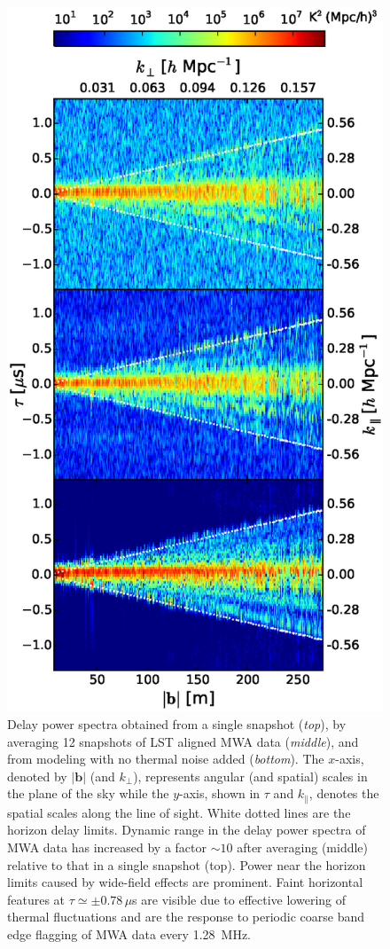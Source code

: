 \documentclass[preprint2,apjl,numberedappendix,twocolappendix,appendixfloats]{emulateapj}
\begin{document}
\begin{figure}[htb]
\centering
\includegraphics[width=\linewidth]{f1.eps}
\caption{Delay power spectra obtained from a single snapshot ({\it top}), by averaging 12 snapshots of LST aligned MWA data ({\it middle}), and from modeling with no thermal noise added ({\it bottom}). The $x$-axis, denoted by $|\boldsymbol{b}|$ (and $k_\perp$), represents angular (and spatial) scales in the plane of the sky while the $y$-axis, shown in $\tau$ and $k_\parallel$, denotes the spatial scales along the line of sight. White dotted lines are the horizon delay limits. Dynamic range in the delay power spectra of MWA data has increased by a factor $\sim 10$ after averaging (middle) relative to that in a single snapshot (top). Power near the horizon limits caused by wide-field effects are prominent. Faint horizontal features at $\tau\simeq\pm 0.78\,\mu$s are visible due to effective lowering of thermal fluctuations and are the response to periodic coarse band edge flagging of MWA data every 1.28~MHz. \label{fig:delay-spectra}}

\end{figure}
\end{document}
